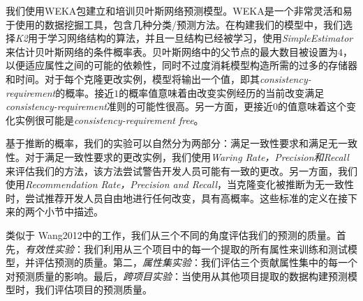 
我们使用WEKA包建立和培训贝叶斯网络预测模型。WEKA是一个非常灵活和易于使用的数据挖掘工具，包含几种分类/预测方法。在构建我们的模型中，我们选择{\em K2}用于学习网络结构的算法，并且一旦结构已经被学习，使用{\em  SimpleEstimator}来估计贝叶斯网络的条件概率表。贝叶斯网络中的父节点的最大数目被设置为$ 4 $，以便适应属性之间的可能的依赖性，同时不过度消耗模型构造所需的过多的存储器和时间。对于每个克隆更改实例，模型将输出一个值，即其{\em consistency-requirement}的概率。接近$ 1 $的概率值意味着由改变实例经历的当前改变满足{\em consistency-requirement}准则的可能性很高。另一方面，更接近$ 0 $的值意味着这个变化实例很可能是{\em consistency-requirement free}。

基于推断的概率，我们的实验可以自然分为两部分：满足一致性要求和满足无一致性。对于满足一致性要求的更改实例，我们使用{\em Waring Rate，Precision和Recall}来评估我们的方法，该方法尝试警告开发人员可能有一致的更改。另一方面，我们使用{\em Recommendation Rate，Precision and Recall}，当克隆变化被推断为无一致性时，尝试推荐开发人员自由地进行任何改变，具有高概率。这些标准的定义在接下来的两个小节中描述。

类似于\cite{} {Wang2012}中的工作，我们从三个不同的角度评估我们的预测的质量。首先，{\em 有效性实验}：我们利用从三个项目中的每一个提取的所有属性来训练和测试模型，并评估预测的质量。第二，{\em 属性集实验}：我们评估三个贡献属性集中的每一个对预测质量的影响。最后，{\em 跨项目实验}：当使用从其他项目提取的数据构建预测模型时，我们评估项目的预测质量。


